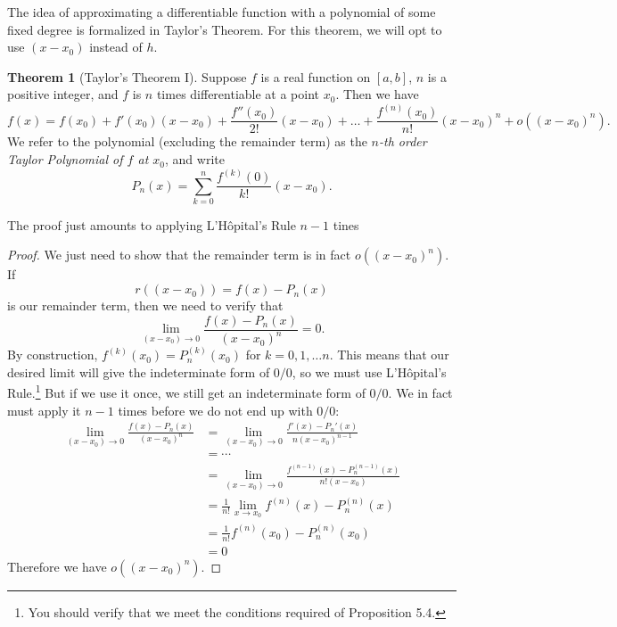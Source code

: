 \documentclass{article}
\theoremstyle{definition}
\newtheorem{theorem}{Theorem}[section]
\begin{document}
The idea of approximating a differentiable function with a polynomial of some fixed degree is formalized in Taylor's Theorem. For this theorem, we will opt to use $ (x-x_0) $ instead of $ h $.
\begin{theorem}[Taylor's Theorem I]
Suppose $ f $ is a real function on $ [a,b] $, $ n $ is a positive integer, and $ f $ is $ n $ times differentiable at a point $ x_0 $. Then we have $$ f(x)=f(x_0)+f'(x_0)(x-x_0)+\frac{f''(x_0)}{2!}(x-x_0)+\ldots+\frac{f^{(n)}(x_0)}{n!}(x-x_0)^n+o((x-x_0)^n).$$ We refer to the polynomial (excluding the remainder term) as the \textit{\color{red}$ n $-th order Taylor Polynomial of $ f $ at $ x_0 $}, and write $$ P_n(x)=\sum_{k=0}^{n}\frac{f^{(k)}(0)}{k!}(x-x_0) .$$
\end{theorem}
The proof just amounts to applying L'H\^{o}pital's Rule $ n-1 $ tines
\begin{proof}
We just need to show that the remainder term is in fact $ o((x-x_0)^n) $. If $$ r((x-x_0))=f(x)-P_n(x) $$ is our remainder term, then we need to verify that $$ \lim\limits_{(x-x_0)\to 0}\frac{f(x)-P_n(x)}{(x-x_0)^n}=0.$$ By construction, $ f^{(k)}(x_0)=P_n^{(k)}(x_0) $ for $ k=0,1,\ldots n $. This means that our desired limit will give the indeterminate form of $ 0/0 $, so we must use L'H\^{o}pital's Rule.\footnote{You should verify that we meet the conditions required of Proposition 5.4.} But if we use it once, we still get an indeterminate form of $ 0/0 $. We in fact must apply it $ n-1 $ times before we do not end up with $ 0/0 $:
\begin{align*}
\lim\limits_{(x-x_0)\to 0}\frac{f(x)-P_n(x)}{(x-x_0)^n}&=\lim\limits_{(x-x_0)\to 0}\frac{f'(x)-P_n'(x)}{n(x-x_0)^{n-1}}\\
&=\cdots\\
&=\lim\limits_{(x-x_0)\to 0}\frac{f^{(n-1)}(x)-P_n^{(n-1)}(x)}{n!(x-x_0)}\\
&=\frac{1}{n!}\lim\limits_{x\to x_0}{f^{(n)}(x)-P_n^{(n)}(x)}\\
&=\frac{1}{n!}f^{(n)}(x_0)-P_n^{(n)}(x_0)\\
&=0
\end{align*}
Therefore we have  $ o((x-x_0)^n) $. 
\end{proof}
\end{document}
